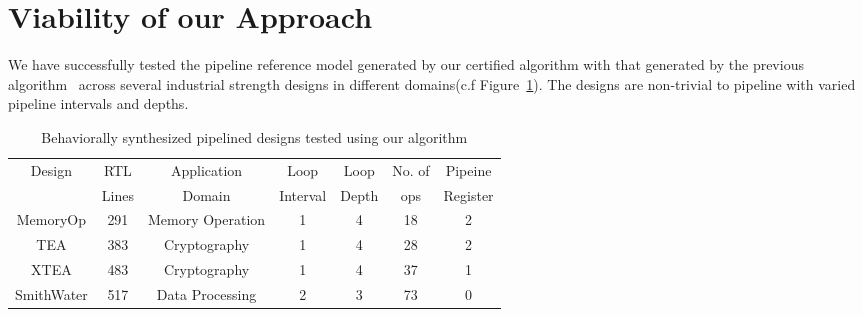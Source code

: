 \section{Viability of our Approach}
\label{sec:SEC}

We have successfully tested the pipeline reference model generated by our certified algorithm with that generated by the previous algorithm~\cite{kechengthesis} across several industrial strength designs in different domains(c.f Figure~\ref{fig:testing}). The designs are non-trivial to pipeline with varied pipeline intervals and depths.

\begin{table}[h!]
  \centering
  \caption{Behaviorally synthesized pipelined designs tested using our algorithm}
  \label{fig:testing}
  \begin{tabular}{|c|c|c|c|c|c|c|}
    \hline
    Design & RTL & Application & Loop & Loop & No. of & Pipeine \\
               & Lines & Domain & Interval & Depth & ops & Register \\
    \hline
    MemoryOp & 291 & Memory Operation & 1 & 4 & 18 & 2 \\
    \hline
    TEA & 383 & Cryptography & 1 & 4 & 28 & 2 \\
    \hline
    XTEA & 483 & Cryptography & 1 & 4 & 37 & 1 \\
    \hline
    SmithWater & 517 & Data Processing & 2 & 3 & 73 & 0 \\
    \hline
    
  \end{tabular}
\end{table}








